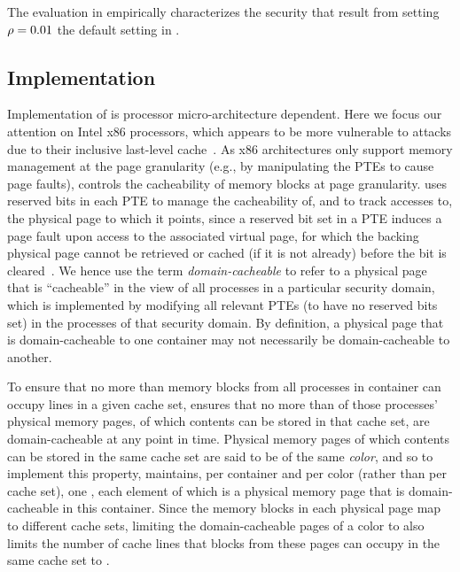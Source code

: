 The evaluation in 
empirically characterizes the security that result from setting
$\rho = 0.01$ the default setting in \cachebar.  

\subsection{Implementation}
\label{cachebar:sec:cacheabilityMgmt:impl}

Implementation of  is processor micro-architecture dependent.
Here we focus our attention on Intel x86 processors, which appears to
be more vulnerable to \primeprobe attacks due to their inclusive
last-level cache~\cite{liu2015practical}.  As x86 architectures only
support memory management at the page granularity (e.g., by
manipulating the \gls{PTE}s to cause page faults), \cachebar controls the
cacheability of memory blocks at page granularity.  \cachebar uses
reserved bits in each \gls{PTE} to manage the cacheability of, and to track
accesses to, the physical page to which it points, since a reserved
bit set in a \gls{PTE} induces a page fault upon access to the associated
virtual page, for which the backing physical page cannot be retrieved
or cached (if it is not already) before the bit is
cleared~\cite{guide2010intel,raikin2014tracking}.  We hence use the
term \textit{domain-cacheable} to refer to a physical page that is
``cacheable'' in the view of all processes in a particular security
domain, which is implemented by modifying all relevant \gls{PTE}s (to have
no reserved bits set) in the processes of that security domain. By
definition, a physical page that is domain-cacheable to one container
may not necessarily be domain-cacheable to another.

To ensure that no more than \linesPerContainer{\containerIdx} memory
blocks from all processes in container \containerIdx can occupy lines
in a given cache set, \cachebar ensures that no more than
\linesPerContainer{\containerIdx} of those processes' physical
memory pages, of which contents can be stored in that cache set, are
domain-cacheable at any point in time. Physical memory pages of which
contents can be stored in the same cache set are said to be of the
same \textit{color}, and so to implement this property, \cachebar
maintains, per container and per color (rather than per cache set),
one \lru, each element of which is a physical memory page that is
domain-cacheable in this container.  Since the memory blocks in each
physical page map to different cache sets, limiting the
domain-cacheable pages of a color to \linesPerContainer{\containerIdx}
also limits the number of cache lines that blocks from these pages can
occupy in the same cache set to \linesPerContainer{\containerIdx}.

